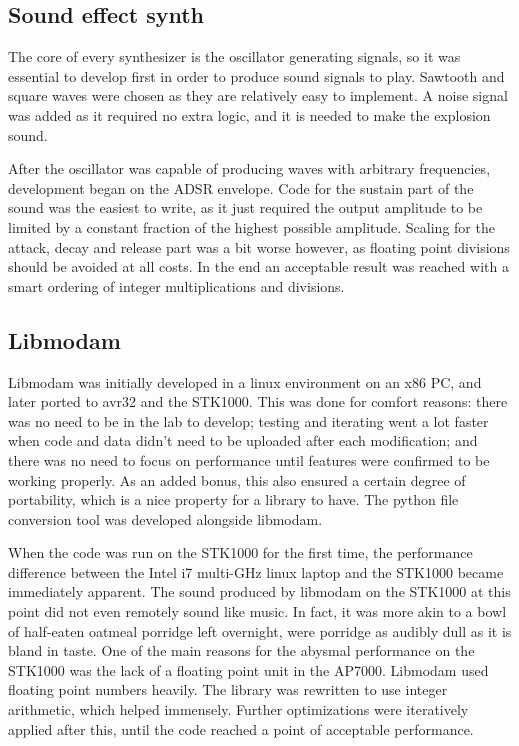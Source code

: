 
\subsection{Sound effect synth}

The core of every synthesizer is the oscillator generating signals, so it was essential to develop first in order to produce sound signals to play.
Sawtooth and square waves were chosen as they are relatively easy to implement.
A noise signal was added as it required no extra logic, and it is needed to make the explosion sound.

After the oscillator was capable of producing waves with arbitrary frequencies, development began on the ADSR envelope.
Code for the sustain part of the sound was the easiest to write, as it just required the output amplitude to be limited by a constant fraction of the highest possible amplitude.
Scaling for the attack, decay and release part was a bit worse however, as floating point divisions should be avoided at all costs.
In the end an acceptable result was reached with a smart ordering of integer multiplications and divisions.

\subsection{Libmodam}

Libmodam was initially developed in a linux environment on an x86 PC, and later ported to avr32 and the STK1000.
This was done for comfort reasons: there was no need to be in the lab to develop; testing and iterating went a lot faster when code and data didn't need to be uploaded after each modification; and there was no need to focus on performance until features were confirmed to be working properly.
As an added bonus, this also ensured a certain degree of portability, which is a nice property for a library to have.
The python file conversion tool was developed alongside libmodam.

When the code was run on the STK1000 for the first time, the performance difference between the Intel i7 multi-GHz linux laptop and the STK1000 became immediately apparent.
The sound produced by libmodam on the STK1000 at this point did not even remotely sound like music.
In fact, it was more akin to a bowl of half-eaten oatmeal porridge left overnight, were porridge as audibly dull as it is bland in taste.
One of the main reasons for the abysmal performance on the STK1000 was the lack of a floating point unit in the AP7000.
Libmodam used floating point numbers heavily.
The library was rewritten to use integer arithmetic, which helped immensely.
Further optimizations were iteratively applied after this, until the code reached a point of acceptable performance.

